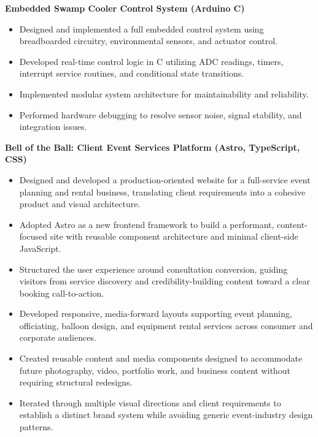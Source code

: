 \documentclass[10pt]{article}
\begin{document}
\textbf{Embedded Swamp Cooler Control System (Arduino C)}
    \begin{itemize}
        \item Designed and implemented a full embedded control system using breadboarded circuitry, environmental sensors, and actuator control.
        
        \item Developed real-time control logic in C utilizing ADC readings, timers, interrupt service routines, and conditional state transitions.
        
        \item Implemented modular system architecture for maintainability and reliability.
        
        \item Performed hardware debugging to resolve sensor noise, signal stability, and integration issues.
    \end{itemize}

\textbf{Bell of the Ball: Client Event Services Platform (Astro, TypeScript, CSS)} 
    \begin{itemize} 
        \item Designed and developed a production-oriented website for a full-service event planning and rental business, translating client requirements into a cohesive product and visual architecture. 
        
        \item Adopted Astro as a new frontend framework to build a performant, content-focused site with reusable component architecture and minimal client-side JavaScript. 
        
        \item Structured the user experience around consultation conversion, guiding visitors from service discovery and credibility-building content toward a clear booking call-to-action. 
        
        \item Developed responsive, media-forward layouts supporting event planning, officiating, balloon design, and equipment rental services across consumer and corporate audiences. 
        \item Created reusable content and media components designed to accommodate future photography, video, portfolio work, and business content without requiring structural redesigns. 
        
        \item Iterated through multiple visual directions and client requirements to establish a distinct brand system while avoiding generic event-industry design patterns. 
    \end{itemize}
\end{document}
